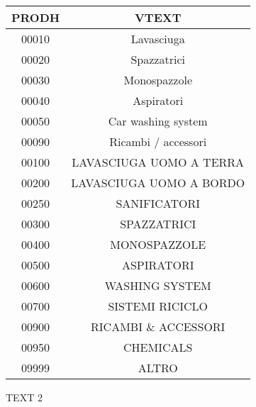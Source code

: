 \begin{minipage}{.5\textwidth}
	\begin{tabular}{|c|c|}
		\toprule
		PRODH &                   VTEXT \\
		\midrule
		00010 &              Lavasciuga \\
		00020 &             Spazzatrici \\
		00030 &            Monospazzole \\
		00040 &              Aspiratori \\
		00050 &      Car washing system \\
		00090 &     Ricambi / accessori \\
		00100 & LAVASCIUGA UOMO A TERRA \\
		00200 & LAVASCIUGA UOMO A BORDO \\
		00250 &            SANIFICATORI \\
		00300 &             SPAZZATRICI \\
		00400 &            MONOSPAZZOLE \\
		00500 &              ASPIRATORI \\
		00600 &          WASHING SYSTEM \\
		00700 &         SISTEMI RICICLO \\
		00900 &     RICAMBI \& ACCESSORI \\
		00950 &               CHEMICALS \\
		09999 &                   ALTRO \\
		\bottomrule
		\end{tabular}
\end{minipage}%
  \begin{minipage}{.5\textwidth}
	TEXT 2
  \end{minipage}





